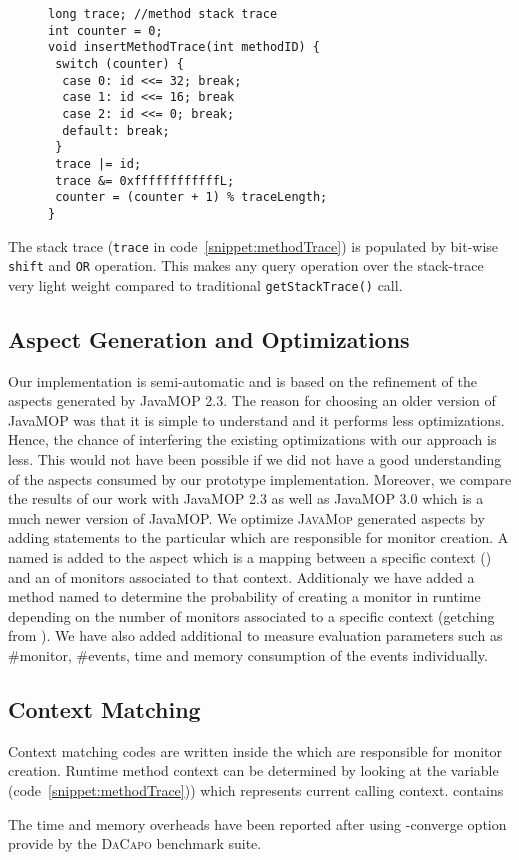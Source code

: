  \begin{figure}[t]
\begin{lstlisting}
long trace; //method stack trace
int counter = 0;
void insertMethodTrace(int methodID) {
 switch (counter) {
  case 0: id <<= 32; break;
  case 1: id <<= 16; break
  case 2: id <<= 0; break;
  default: break;
 }
 trace |= id;
 trace &= 0xffffffffffffL;
 counter = (counter + 1) % traceLength;
}
\end{lstlisting}
\end{figure}
The stack trace (\texttt{trace} in code~\ref{snippet:methodTrace}) is populated
by bit-wise \texttt{shift} and \texttt{OR} operation. This makes any query
operation over the stack-trace very light weight compared to traditional
\texttt{getStackTrace()} call.

\subsection{Aspect Generation and Optimizations}
\label{subsec:aspectGen}

Our implementation is semi-automatic and is based on the refinement of the 
aspects generated by JavaMOP 2.3. The reason for choosing an older version of 
JavaMOP was that it is simple to understand and it performs less optimizations. 
Hence, the chance of interfering the existing optimizations with our approach is 
less. This would not have been possible if we did not have a good understanding 
of the aspects consumed by our prototype implementation. Moreover, we compare 
the results of our work with JavaMOP 2.3 as well as JavaMOP 3.0 which is a much 
newer version of JavaMOP. We optimize \textsc{JavaMop} generated aspects by
adding statements to the particular  which are responsible for
monitor creation. A  named  is added to
the aspect which is a mapping between a specific context () and an
 of monitors associated to that context. Additionaly we have
added a method named  to determine the probability of
creating a monitor in runtime depending on the number of monitors associated to
a specific context (getching from ). We have also added
additional  to measure evaluation parameters such as \#monitor,
\#events, time and memory consumption of the events individually.


\subsection{Context Matching}
\label{subsec:contextMatch}

Context matching codes are written inside the  which are
responsible for monitor creation. Runtime method context can be determined by
looking at the  variable (code~\ref{snippet:methodTrace})) which
represents current calling context.  contains 

The time and memory overheads have been reported after using -converge option 
provide by the \textsc{DaCapo} benchmark suite.